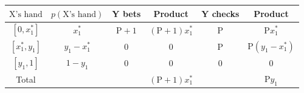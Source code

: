 \documentclass[border=3pt]{standalone}
\begin{document}
{\Large
\renewcommand{\arraystretch}{1.3}
\begin{tabular}{|c|c|c|c|c|c|}
\hline
    $\mathrm{X}\text{'s hand}$ &
    $p(\mathrm{X}\text{'s hand})$ &
    Y bets &
    Product &
    Y checks &
    Product \\
\hline
    $[0, x_1^*]$ &
    $x_1^*$ &
    $\mathrm{P}+1$ &
    $(\mathrm{P}+1)x_1^*$ &
    $\mathrm{P}$ &
    $\mathrm{P}x_1^*$ \\
\hline
    $[x_1^*, y_1]$ &
    $y_1 - x_1^*$ &
    $0$ &
    $0$ &
    $\mathrm{P}$ &
    $\mathrm{P}(y_1 - x_1^*)$ \\
\hline
    $[y_1, 1]$ &
    $1 - y_1$ &
    $0$ &
    $0$ &
    $0$ &
    $0$ \\
\hline
    Total & & & $(\mathrm{P}+1)x_1^*$ & & $\mathrm{P}y_1$ \\
\hline
\end{tabular}
}
\end{document}
